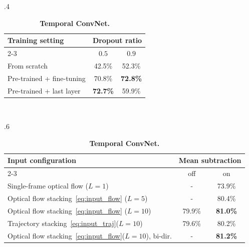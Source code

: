 \documentclass{article} %
\begin{document}
\begin{table}[ht]
\setlength{\tabcolsep}{4pt}
\small
\caption{\textbf{Individual ConvNets accuracy on UCF-101 (split 1).}}
\begin{subtable}{.4\textwidth}
\vspace{-2em}
\centering
\caption{\textbf{Spatial ConvNet.}}
\begin{tabular}{|l|c|c|} \hline
\multirow{2}{*}{Training setting} & \multicolumn{2}{c|}{Dropout ratio} \\ \cline{2-3}
 & $0.5$ & $0.9$  \\ \hline
From scratch & 42.5\%  & 52.3\% \\ \hline
Pre-trained + fine-tuning & 70.8\%  & \textbf{72.8\%}  \\ \hline
Pre-trained + last layer & \textbf{72.7\%} & 59.9\%  \\ \hline
\end{tabular}
\label{tab:spatial}
\end{subtable}
~~~
\begin{subtable}{.6\textwidth}
\centering
\caption{\textbf{Temporal ConvNet.}}
\begin{tabular}{|l|c|c|} \hline
\multirow{2}{*}{Input configuration} & \multicolumn{2}{c|}{Mean subtraction} \\ \cline{2-3}
 & off & on  \\ \hline
Single-frame optical flow ($L=1$) & - & 73.9\% \\ \hline
Optical flow stacking~\eqref{eq:input_flow} ($L=5$) & - & 80.4\% \\ \hline
Optical flow stacking~\eqref{eq:input_flow} ($L=10$) & 79.9\% & \textbf{81.0\%} \\ \hline
Trajectory stacking~\eqref{eq:input_traj}($L=10$) & 79.6\% & 80.2\% \\ \hline
Optical flow stacking~\eqref{eq:input_flow}($L=10$), bi-dir.  & - & \textbf{81.2\%} \\ \hline
\end{tabular}
\label{tab:temporal}
\end{subtable}
\end{table}
\end{document}
